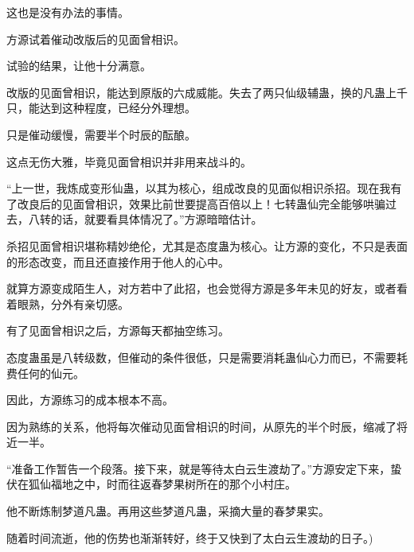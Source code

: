 \begin{this_body}
这也是没有办法的事情。

方源试着催动改版后的见面曾相识。

试验的结果，让他十分满意。

改版的见面曾相识，能达到原版的六成威能。失去了两只仙级辅蛊，换的凡蛊上千只，能达到这种程度，已经分外理想。

只是催动缓慢，需要半个时辰的酝酿。

这点无伤大雅，毕竟见面曾相识并非用来战斗的。

“上一世，我炼成变形仙蛊，以其为核心，组成改良的见面似相识杀招。现在我有了改良后的见面曾相识，效果比前世要提高百倍以上！七转蛊仙完全能够哄骗过去，八转的话，就要看具体情况了。”方源暗暗估计。

杀招见面曾相识堪称精妙绝伦，尤其是态度蛊为核心。让方源的变化，不只是表面的形态改变，而且还直接作用于他人的心中。

就算方源变成陌生人，对方若中了此招，也会觉得方源是多年未见的好友，或者看着眼熟，分外有亲切感。

有了见面曾相识之后，方源每天都抽空练习。

态度蛊虽是八转级数，但催动的条件很低，只是需要消耗蛊仙心力而已，不需要耗费任何的仙元。

因此，方源练习的成本根本不高。

因为熟练的关系，他将每次催动见面曾相识的时间，从原先的半个时辰，缩减了将近一半。

“准备工作暂告一个段落。接下来，就是等待太白云生渡劫了。”方源安定下来，蛰伏在狐仙福地之中，时而往返春梦果树所在的那个小村庄。

他不断炼制梦道凡蛊。再用这些梦道凡蛊，采摘大量的春梦果实。

随着时间流逝，他的伤势也渐渐转好，终于又快到了太白云生渡劫的日子。)

\end{this_body}

